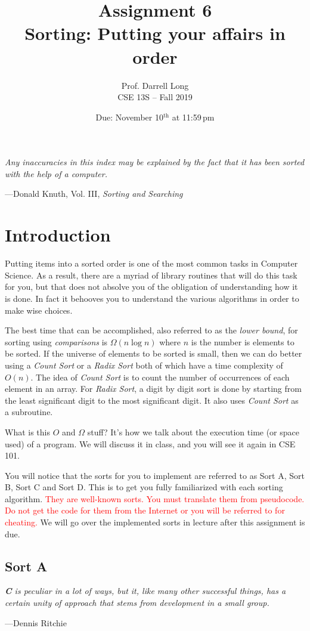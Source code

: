 \documentclass{article}
\title{Assignment 6 \\ Sorting: Putting your affairs in order}
\author{Prof. Darrell Long \\
CSE 13S -- Fall 2019}
\date{Due: November 10$^\text{th}$ at 11:59\,pm}
\begin{document}
\maketitle
{}\textwidth
\epigraph{\emph{Any inaccuracies in this index may be explained by the fact
that it has been sorted with the help of a computer.}}{---Donald Knuth, Vol.
III, \emph{Sorting and Searching}}


\section{Introduction}
Putting items into a sorted order is one of the most common tasks in Computer
Science. As a result, there are a myriad of library routines that will do
this task for you, but that does not absolve you of the obligation of
understanding how it is done. In fact it behooves you to understand the
various algorithms in order to make wise choices.

The best time that can be accomplished, also referred to as the \emph{lower bound}, for sorting using
\emph{comparisons} is $\Omega(n \log n)$ where $n$ is the number is elements
to be sorted. If the universe of elements to be sorted is small,
then we can do better using a \emph{Count Sort} or a \emph{Radix Sort} both of which have a time complexity of $O(n)$. The idea of \emph{Count Sort} is to count the number of occurrences of each element in an array. For \emph{Radix Sort}, a digit by digit sort is done by starting from the least significant digit to the most significant digit. It also uses \emph{Count Sort} as a subroutine.

What is this $O$ and $\Omega$ stuff? It's how we talk about the execution time
(or space used) of a program. We will discuss it in class, and you will see it again
in CSE 101.

You will notice that the sorts for you to implement are referred
to as Sort A, Sort B, Sort C and Sort D. This is to get you fully
familiarized with each sorting algorithm. \textcolor{red}{They are
well-known sorts. You must translate them from pseudocode. Do not
get the code for them from the Internet or you will be referred to
for cheating.} We will go over the implemented sorts in lecture
after this assignment is due.

\subsection{Sort A} %
\epigraph{\emph{\textbf{C} is peculiar in a lot of ways, but it, like many other
successful things, has a certain unity of approach that stems from development
in a small group.}}{---Dennis Ritchie}
\end{document}
